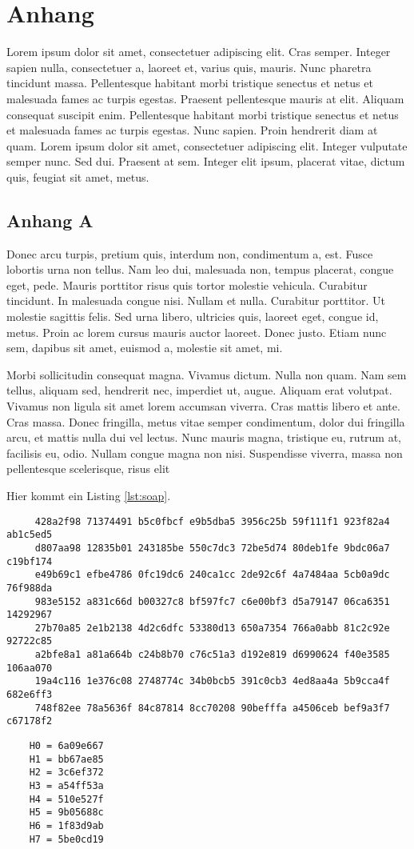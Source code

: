 
\appendix
\chapter{Anhang}
Lorem ipsum dolor sit amet, consectetuer adipiscing elit. Cras semper. Integer sapien nulla, consectetuer a, laoreet et, varius quis, mauris. Nunc pharetra tincidunt massa. Pellentesque habitant morbi tristique senectus et netus et malesuada fames ac turpis egestas. Praesent pellentesque mauris at elit. Aliquam consequat suscipit enim. Pellentesque habitant morbi tristique senectus et netus et malesuada fames ac turpis egestas. Nunc sapien. Proin hendrerit diam at quam. Lorem ipsum dolor sit amet, consectetuer adipiscing elit. Integer vulputate semper nunc. Sed dui. Praesent at sem. Integer elit ipsum, placerat vitae, dictum quis, feugiat sit amet, metus.

\section{Anhang A}
Donec arcu turpis, pretium quis, interdum non, condimentum a, est. Fusce lobortis urna non tellus. Nam leo dui, malesuada non, tempus placerat, congue eget, pede. Mauris porttitor risus quis tortor molestie vehicula. Curabitur tincidunt. In malesuada congue nisi. Nullam et nulla. Curabitur porttitor. Ut molestie sagittis felis. Sed urna libero, ultricies quis, laoreet eget, congue id, metus. Proin ac lorem cursus mauris auctor laoreet. Donec justo. Etiam nunc sem, dapibus sit amet, euismod a, molestie sit amet, mi.

Morbi sollicitudin consequat magna. Vivamus dictum. Nulla non quam. Nam sem tellus, aliquam sed, hendrerit nec, imperdiet ut, augue. Aliquam erat volutpat. Vivamus non ligula sit amet lorem accumsan viverra. Cras mattis libero et ante. Cras massa. Donec fringilla, metus vitae semper condimentum, dolor dui fringilla arcu, et mattis nulla dui vel lectus. Nunc mauris magna, tristique eu, rutrum at, facilisis eu, odio. Nullam congue magna non nisi. Suspendisse viverra, massa non pellentesque scelerisque, risus elit 

\noindent Hier kommt ein Listing \ref{lst:soap}.

\begin{center}
\begin{lstlisting}
	 428a2f98 71374491 b5c0fbcf e9b5dba5 3956c25b 59f111f1 923f82a4 ab1c5ed5
	 d807aa98 12835b01 243185be 550c7dc3 72be5d74 80deb1fe 9bdc06a7 c19bf174
	 e49b69c1 efbe4786 0fc19dc6 240ca1cc 2de92c6f 4a7484aa 5cb0a9dc 76f988da
	 983e5152 a831c66d b00327c8 bf597fc7 c6e00bf3 d5a79147 06ca6351 14292967
	 27b70a85 2e1b2138 4d2c6dfc 53380d13 650a7354 766a0abb 81c2c92e 92722c85
	 a2bfe8a1 a81a664b c24b8b70 c76c51a3 d192e819 d6990624 f40e3585 106aa070
	 19a4c116 1e376c08 2748774c 34b0bcb5 391c0cb3 4ed8aa4a 5b9cca4f 682e6ff3
	 748f82ee 78a5636f 84c87814 8cc70208 90befffa a4506ceb bef9a3f7 c67178f2
\end{lstlisting}
\begin{lstlisting}
	H0 = 6a09e667
	H1 = bb67ae85
	H2 = 3c6ef372
	H3 = a54ff53a
	H4 = 510e527f
	H5 = 9b05688c
	H6 = 1f83d9ab
	H7 = 5be0cd19
\end{lstlisting}
\end{center}

